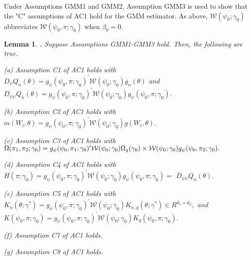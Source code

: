 \documentclass[12pt,thmsb,titlepage,final,oneside,letterpaper]{article}
\newtheorem{lemma}{Lemma}[section]
\begin{document}
Under Assumptions GMM1 and GMM2, Assumption GMM3 is used to show that the
"C" assumptions of AC1 hold for the GMM estimator. As above, $\mathcal{W}%
(\psi _{0};\gamma _{0})$ abbreviates $\mathcal{W}(\psi _{0},\pi ;\gamma
_{0}) $ when $\beta _{0}=0.$

\begin{lemma}
\textbf{\hspace{-0.08in}.} \label{Lemma GMM suff condition C}Suppose
Assumptions \emph{GMM1-GMM3 }hold. Then, the following are true.

\noindent \emph{(a)} Assumption \emph{C1} of \emph{AC1} holds with $D_{\psi
}Q_{n}(\theta )=g_{\psi }(\psi _{0},\pi ;\gamma _{0})^{\prime }\mathcal{W}%
(\psi _{0};\gamma _{0})\overline{g}_{n}(\theta )$ and \newline
$D_{\psi \psi }Q_{n}(\theta )=g_{\psi }(\psi _{0},\pi ;\gamma _{0})^{\prime }%
\mathcal{W}(\psi _{0};\gamma _{0})g_{\psi }(\psi _{0},\pi ;\gamma _{0}).$

\noindent \emph{(b)} Assumption \emph{C2} of \emph{AC1 }holds with $%
m(W_{i},\theta )=g_{\psi }(\psi _{0},\pi ;\gamma _{0})^{\prime }\mathcal{W}%
(\psi _{0};\gamma _{0})g(W_{i},\theta ).$

\noindent \emph{(c)} Assumption \emph{C3} of \emph{AC1 }holds with $\Omega
(\pi _{1},\pi _{2};\gamma _{0})=g_{\psi }(\psi _{0},\pi _{1};\gamma
_{0})^{\prime }\mathcal{W}(\psi _{0};\gamma _{0})\Omega _{g}(\gamma _{0})%
\newline
\times \mathcal{W}(\psi _{0};\gamma _{0})g_{\psi }(\psi _{0},\pi _{2};\gamma
_{0}).$

\noindent \emph{(d)} Assumption \emph{C4} of \emph{AC1 }holds with $H(\pi
;\gamma _{0})=g_{\psi }(\psi _{0},\pi ;\gamma _{0})^{\prime }\mathcal{W}%
(\psi _{0};\gamma _{0})g_{\psi }(\psi _{0},\pi ;\gamma _{0})=$\newline
$D_{\psi \psi }Q_{n}(\theta ).$

\noindent \emph{(e)} Assumption \emph{C5} of \emph{AC1 }holds with $%
K_{n}(\theta ;\gamma ^{\ast })=g_{\psi }(\psi _{0},\pi ;\gamma _{0})^{\prime
}\mathcal{W}(\psi _{0};\gamma _{0})K_{n,g}(\theta ;\gamma ^{\ast })\in
R^{d_{\psi }\times d_{\beta }},$ and $K(\psi _{0},\pi ;\gamma _{0})=g_{\psi
}(\psi _{0},\pi ;\gamma _{0})^{\prime }\mathcal{W}(\psi _{0};\gamma
_{0})K_{g}(\psi _{0},\pi ;\gamma _{0}).$

\noindent \emph{(f) }Assumption \emph{C7} of \emph{AC1 }holds.

\noindent \emph{(g) }Assumption \emph{C8} of \emph{AC1 }holds.
\end{lemma}
\end{document}
